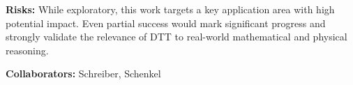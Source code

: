 \documentclass[a4paper,11pt]{article}
\newcommand{\solidbowtie}{\blacktriangleright\!\!\blacktriangleleft}
\newcommand{\deliv}{\textcolor{deliverable}{\raisebox{-.25em}{\DiamondSolid}}}
\newcommand{\teamm}[2]{\raisebox{-.25em}{\ensuremath{\overset{\textup{#1}}{\text{\textcolor{#2}{$\solidbowtie$}}}}}}
\newcommand{\tmN}{\teamm{N}{nottColour}}
\newcommand{\tmS}{\teamm{S}{strathColour}}
\begin{document}
\textbf{Risks:} While exploratory, this work targets a key application
area with high potential impact. Even partial success would mark
significant progress and strongly validate the relevance of DTT to
real-world mathematical and physical reasoning.

\textbf{Collaborators:} Schreiber, Schenkel


\newpage

\end{document}
